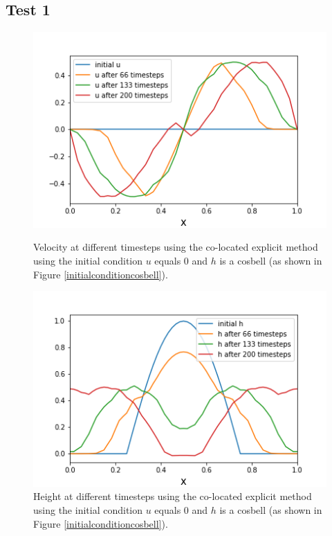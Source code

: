 \documentclass[a4paper,12pt, notitlepage]{article}
\begin{document}
\subsection{Test 1}
\begin{figure} [H]
	\begin{minipage}{.5\textwidth}
		\ContinuedFloat*
		\captionsetup{width=0.9\textwidth}
		\captionsetup{justification=centering}
		\includegraphics[width=\textwidth]{velocity_colocated_explicit_cosbell.png}
		\caption{\label{velocity_colocated_explicit_cosbell} Velocity at different timesteps using the co-located explicit method using the initial condition $u$ equals $0$ and $h$ is a cosbell (as shown in Figure \ref{initialconditioncosbell}).} 
	\end{minipage}
	\begin{minipage}{.5\textwidth}
		\ContinuedFloat
		\captionsetup{width=0.9\textwidth}
		\captionsetup{justification=centering}
		\includegraphics[width=\textwidth]{height_colocated_explicit_cosbell.png}
		\caption{\label{height_colocated_explicit_cosbell}    Height at different timesteps using the co-located explicit method using the initial condition $u$ equals $0$ and $h$ is a cosbell (as shown in Figure \ref{initialconditioncosbell}).} 
	\end{minipage}
\end{figure}
\end{document}
